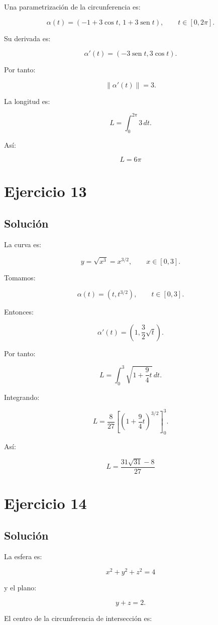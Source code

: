 \documentclass[11pt,a4paper]{article}
\newcommand{\sen}{\operatorname{sen}}
\begin{document}
Una parametrización de la circunferencia es:

\[
\alpha(t)
=
(-1+3\cos t,\,
1+3\sen t),
\qquad
t\in[0,2\pi].
\]

Su derivada es:

\[
\alpha'(t)
=
(-3\sen t,3\cos t).
\]

Por tanto:

\[
\|\alpha'(t)\|
=
3.
\]

La longitud es:

\[
L
=
\int_0^{2\pi}
3\,dt.
\]

Así:

\[
\boxed{
L=6\pi
}
\]

\section{Ejercicio 13}
\subsection{Solución}

La curva es:

\[
y=\sqrt{x^3}=x^{3/2},
\qquad
x\in[0,3].
\]

Tomamos:

\[
\alpha(t)
=
(t,t^{3/2}),
\qquad
t\in[0,3].
\]

Entonces:

\[
\alpha'(t)
=
\left(
1,\frac32\sqrt t
\right).
\]

Por tanto:

\[
L
=
\int_0^3
\sqrt{
1+\frac94t
}\,dt.
\]

Integrando:

\[
L
=
\frac8{27}
\left[
\left(
1+\frac94t
\right)^{3/2}
\right]_0^3.
\]

Así:

\[
\boxed{
L
=
\frac{31\sqrt{31}-8}{27}
}
\]

\section{Ejercicio 14}
\subsection{Solución}

La esfera es:

\[
x^2+y^2+z^2=4
\]

y el plano:

\[
y+z=2.
\]

El centro de la circunferencia de intersección es:
\end{document}
